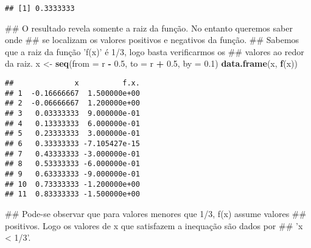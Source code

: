 \documentclass[]{book}
\newenvironment{Shaded}{\begin{snugshade}}{\end{snugshade}}
\newcommand{\KeywordTok}[1]{\textcolor[rgb]{0.13,0.29,0.53}{\textbf{#1}}}
\newcommand{\DataTypeTok}[1]{\textcolor[rgb]{0.13,0.29,0.53}{#1}}
\newcommand{\DecValTok}[1]{\textcolor[rgb]{0.00,0.00,0.81}{#1}}
\newcommand{\FloatTok}[1]{\textcolor[rgb]{0.00,0.00,0.81}{#1}}
\newcommand{\StringTok}[1]{\textcolor[rgb]{0.31,0.60,0.02}{#1}}
\newcommand{\OperatorTok}[1]{\textcolor[rgb]{0.81,0.36,0.00}{\textbf{#1}}}
\newcommand{\NormalTok}[1]{#1}
\begin{document}
\begin{enumerate}
\begin{Shaded}
\end{Shaded}

\begin{verbatim}
## [1] 0.3333333
\end{verbatim}

\begin{Shaded}
\begin{Highlighting}[]
\NormalTok{##  O resultado revela somente a raiz da função. No entanto queremos saber onde}
\NormalTok{## se localizam os valores positivos e negativos da função.}
\NormalTok{##  Sabemos que a raiz da função 'f(x)' é 1/3, logo basta verificarmos os}
\NormalTok{## valores ao redor da raiz.}
\NormalTok{x <-}\StringTok{ }\KeywordTok{seq}\NormalTok{(}\DataTypeTok{from =}\NormalTok{ r }\OperatorTok{-}\StringTok{ }\FloatTok{0.5}\NormalTok{, }\DataTypeTok{to =}\NormalTok{ r }\OperatorTok{+}\StringTok{ }\FloatTok{0.5}\NormalTok{, }\DataTypeTok{by =} \FloatTok{0.1}\NormalTok{)}
\KeywordTok{data.frame}\NormalTok{(x, }\KeywordTok{f}\NormalTok{(x))}
\end{Highlighting}
\end{Shaded}

\begin{verbatim}
##              x          f.x.
## 1  -0.16666667  1.500000e+00
## 2  -0.06666667  1.200000e+00
## 3   0.03333333  9.000000e-01
## 4   0.13333333  6.000000e-01
## 5   0.23333333  3.000000e-01
## 6   0.33333333 -7.105427e-15
## 7   0.43333333 -3.000000e-01
## 8   0.53333333 -6.000000e-01
## 9   0.63333333 -9.000000e-01
## 10  0.73333333 -1.200000e+00
## 11  0.83333333 -1.500000e+00
\end{verbatim}

\begin{Shaded}
\begin{Highlighting}[]
\NormalTok{##  Pode-se observar que para valores menores que 1/3, f(x) assume valores}
\NormalTok{## positivos. Logo os valores de x que satisfazem a inequação são dados por}
\NormalTok{## 'x < 1/3'.}


\end{Highlighting}
\end{Shaded}
\end{enumerate}
\end{document}
